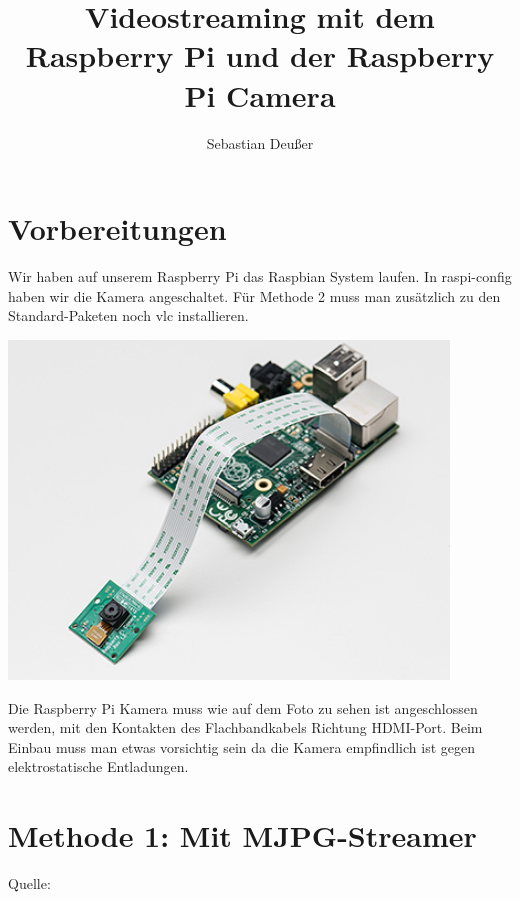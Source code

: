 \documentclass[12pt,a4paper,titlepage]{scrartcl} %
\title{Videostreaming mit dem Raspberry Pi und der Raspberry Pi Camera}
\author{Sebastian Deußer}
\begin{document}
\maketitle %

\pagestyle{fancy}
\lhead{}
\chead{\leftmark}
\rhead{}
\cfoot{}

\thispagestyle{fancy}

\section{Vorbereitungen}
Wir haben auf unserem Raspberry Pi das Raspbian System laufen. In raspi-config haben wir die Kamera angeschaltet. Für Methode 2 muss man zusätzlich zu den Standard-Paketen noch vlc installieren.
	\begin{center}
		\includegraphics[height=9cm]{Streaming/1367_MED}
	\end{center}
Die Raspberry Pi Kamera muss wie auf dem Foto zu sehen ist angeschlossen werden, mit den Kontakten des Flachbandkabels Richtung HDMI-Port. Beim Einbau muss man etwas vorsichtig sein da die Kamera empfindlich ist gegen elektrostatische Entladungen.

\newpage
\section{Methode 1: Mit MJPG-Streamer}
\small{Quelle: }
\end{document}
